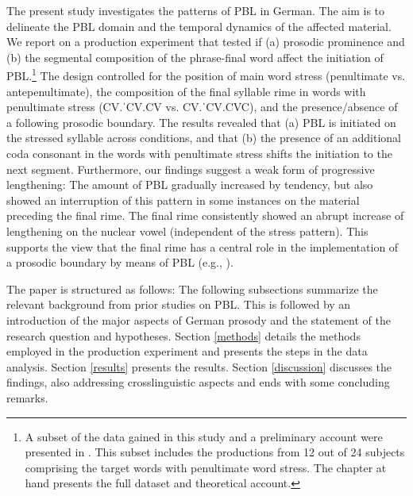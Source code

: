 \documentclass[output=paper]{langscibook}
\begin{document}
The present study investigates the patterns of PBL in German. The aim is to delineate the PBL domain and the temporal dynamics of the affected material. We report on a production experiment that tested if (a) prosodic prominence and (b) the segmental composition of the phrase-final word affect the initiation of PBL.\footnote{A subset of the data gained in this study and a preliminary account were presented in \citet{SchuboeZerbian2020}. This subset includes the productions from 12 out of 24 subjects comprising the target words with penultimate word stress. The chapter at hand presents the full dataset and theoretical account.} The design controlled for the position of main word stress (penultimate vs. antepenultimate), the composition of the final syllable rime in words with penultimate stress (CV.ˈCV.CV vs. CV.ˈCV.CVC), and the presence\slash absence of a following prosodic boundary. The results revealed that (a) PBL is initiated on the stressed syllable across conditions, and that (b) the presence of an additional coda consonant in the words with penultimate stress shifts the initiation to the next segment. Furthermore, our findings suggest a weak form of progressive lengthening: The amount of PBL gradually increased by tendency, but also showed an interruption of this pattern in some instances on the material preceding the final rime. The final rime consistently showed an abrupt increase of lengthening on the nuclear vowel (independent of the stress pattern). This supports the view that the final rime has a central role in the implementation of a prosodic boundary by means of PBL (e.g., \citealt{TurkShattuck-Hufnagel2007}).

The paper is structured as follows: The following subsections summarize the relevant background from prior studies on PBL. This is followed by an introduction of the major aspects of German prosody and the statement of the research question and hypotheses. Section \ref{methods} details the methods employed in the production experiment and presents the steps in the data analysis. Section \ref{results} presents the results. Section \ref{discussion} discusses the findings, also addressing crosslinguistic aspects and ends with some concluding remarks.
\end{document}
